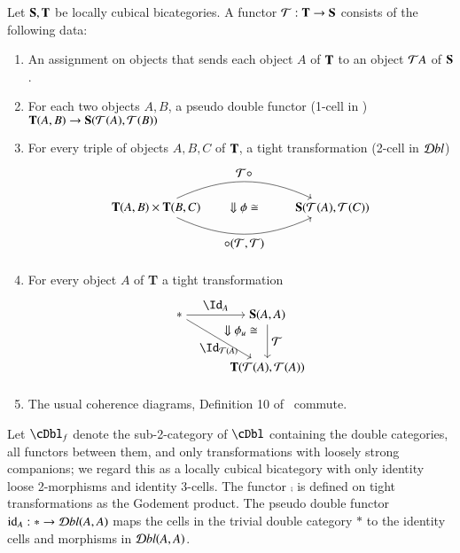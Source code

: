 \begin{defn}\label{def:lcbcfunc}
Let ${\bf S,T}$ be locally cubical bicategories. A functor $\mathcal{T}: {\bf T} \rightarrow {\bf S}$ consists of the following data:
\begin{enumerate}
\item An assignment on objects that sends each object $A$ of ${\bf T}$ to an object $\mathcal{T} A$ of ${\bf S}$.
\item For each two objects $A,B$, a pseudo double functor (1-cell in \cDbl) ${\bf T}(A,B) \rightarrow {\bf S}(\mathcal{T}(A),\mathcal{T}(B))$
\item For every triple of objects $A,B,C$ of ${\bf T}$, a tight transformation (2-cell in $\mathcal{D} bl$) 
\begin{align} 
\begin{tikzpicture}
\node(1) at (0,0) {${\bf T}(A,B) \times {\bf T}(B,C)$};
\node(2) at (5,0) {${\bf S}(\cT(A),\cT(C))$};
\draw[->] (1) to[in=155, out=25] node[above]{$\cT \comp $} (2); 
\draw[->] (1) to[in=-155, out=-25] node[below]{$ \comp (\cT,\cT)$} (2); 
\node at (2.5,0) {$\Downarrow \phi \iso$};
\end{tikzpicture}
\end{align}
\item For every object $A$ of {\bf T} a tight transformation
\begin{align}
\begin{tikzpicture}[xscale=.5, yscale=.3]
\node(1) at (0,0) {$*$};
\node(2) at (5,0) {${\bf S}(A,A)$};
\node(3) at (5,-5) {${\bf T}(\cT(A),\cT(A))$};
\draw[->] (1) to node[above]{$\looseid_{A}$} (2); 
\draw[->] (1) to node[below]{$\looseid_{\cT(A)}$} (3);
\draw[->] (2) to node[right]{$\cT$} (3); 
\node at (3.5,-1.5) {$\Downarrow \phi_u \iso$};
\end{tikzpicture}
\end{align}
\item The usual coherence diagrams, Definition 10 of~\cite{nick:tricatsbook} commute.
\end{enumerate}
\end{defn}


Let $\cDbl_f$ denote the sub-2-category of $\cDbl$ containing the double categories, all functors between them, and only transformations with loosely strong companions; we regard this as a locally cubical bicategory with only identity loose 2-morphisms and identity 3-cells.  The functor $\comp$ is defined on tight transformations as the Godement product. The pseudo double functor $\mathrm{id}_A: * \rightarrow \mathcal{D} bl(A,A)$ maps the cells in the trivial double category $*$ to the identity cells and morphisms in $\mathcal{D} bl(A,A)$. 

